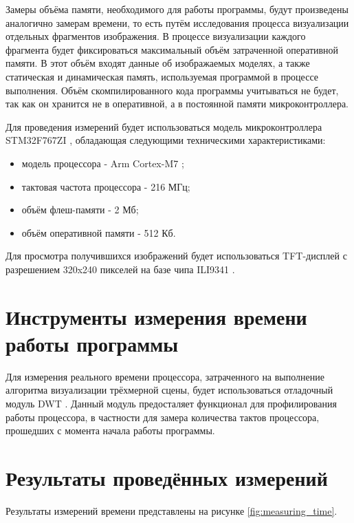 Замеры объёма памяти, необходимого для работы программы, будут произведены аналогично замерам времени, то есть путём исследования 
процесса визуализации отдельных фрагментов изображения. В процессе визуализации каждого фрагмента будет фиксироваться максимальный 
объём затраченной оперативной памяти. В этот объём входят данные об изображаемых моделях, а также статическая и динамическая память, 
используемая программой в процессе выполнения. Объём скомпилированного кода программы учитываться не будет, так как он хранится 
не в оперативной, а в постоянной памяти микроконтроллера.

Для проведения измерений будет использоваться модель микроконтроллера STM32F767ZI \cite{STM32F767ZI}, обладающая следующими 
техническими характеристиками:
\begin{itemize}
	\item модель процессора - Arm Cortex-M7 \cite{cortex_m7};
	\item тактовая частота процессора - 216 МГц;
	\item объём флеш-памяти - 2 Мб;
    \item объём оперативной памяти - 512 Кб.
\end{itemize}

Для просмотра получившихся изображений будет использоваться TFT-дисплей с разрешением 320x240 пикселей на базе чипа ILI9341 \cite{ili9341}.



\section{Инструменты измерения времени работы программы}
Для измерения реального времени процессора, затраченного на выполнение алгоритма визуализации трёхмерной сцены, будет использоваться 
отладочный модуль DWT \cite{dwt}. Данный модуль предосталяет функционал для профилирования работы процессора, в частности для замера 
количества тактов процессора, прошедших с момента начала работы программы.



\section{Результаты проведённых измерений}
Результаты измерений времени представлены на рисунке \ref{fig:measuring_time}.

        
